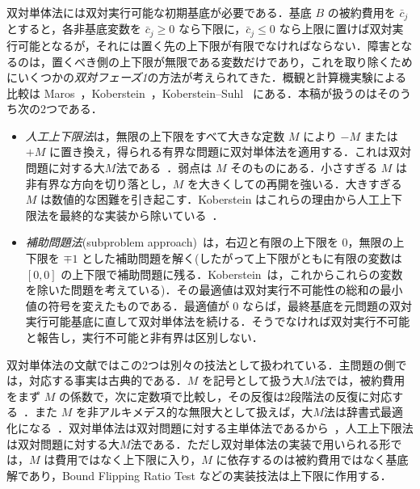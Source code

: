 \documentclass[11pt,a4paper]{ltjsarticle}
\theoremstyle{plain}
\theoremstyle{definition}
\theoremstyle{remark}
\begin{document}
双対単体法には双対実行可能な初期基底が必要である．基底 $B$ の被約費用を $\bar c_j$ とすると，各非基底変数を $\bar c_j\ge0$ なら下限に，$\bar c_j\le0$ なら上限に置けば双対実行可能となるが，それには置く先の上下限が有限でなければならない．障害となるのは，置くべき側の上下限が無限である変数だけであり，これを取り除くためにいくつかの\emph{双対フェーズ1}の方法が考えられてきた．概観と計算機実験による比較は Maros~\cite{maros2003}，Koberstein~\cite{koberstein2005}，Koberstein--Suhl~\cite{koberstein2007} にある．本稿が扱うのはそのうち次の2つである．
\begin{itemize}
\item \emph{人工上下限法}は，無限の上下限をすべて大きな定数 $M$ により $-M$ または $+M$ に置き換え，得られる有界な問題に双対単体法を適用する．これは双対問題に対する大$M$法である~\cite{wolfe1965,koberstein2005}．弱点は $M$ そのものにある．小さすぎる $M$ は非有界な方向を切り落とし，$M$ を大きくしての再開を強いる．大きすぎる $M$ は数値的な困難を引き起こす．Koberstein はこれらの理由から人工上下限法を最終的な実装から除いている~\cite{koberstein2005}．
\item \emph{補助問題法}(subproblem approach)~\cite{fourer1994,koberstein2005,koberstein2007}は，右辺と有限の上下限を $0$，無限の上下限を $\mp1$ とした補助問題を解く(したがって上下限がともに有限の変数は $[0,0]$ の上下限で補助問題に残る．Koberstein~\cite{koberstein2005}は，これからこれらの変数を除いた問題を考えている)．その最適値は双対実行不可能性の総和の最小値の符号を変えたものである．最適値が $0$ ならば，最終基底を元問題の双対実行可能基底に直して双対単体法を続ける．そうでなければ双対実行不可能と報告し，実行不可能と非有界は区別しない．
\end{itemize}
双対単体法の文献ではこの2つは別々の技法として扱われている．主問題の側では，対応する事実は古典的である．$M$ を記号として扱う大$M$法では，被約費用をまず $M$ の係数で，次に定数項で比較し，その反復は2段階法の反復に対応する~\cite[4.3節]{bazaraa2010}．また $M$ を非アルキメデス的な無限大として扱えば，大$M$法は辞書式最適化になる~\cite{sherali1983,cococcioni2021}．双対単体法は双対問題に対する主単体法であるから~\cite{lemke1954}，人工上下限法は双対問題に対する大$M$法である．ただし双対単体法の実装で用いられる形では，$M$ は費用ではなく上下限に入り，$M$ に依存するのは被約費用ではなく基底解であり，Bound Flipping Ratio Test などの実装技法は上下限に作用する．
\end{document}
